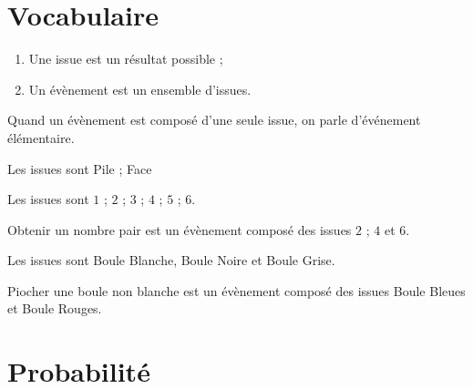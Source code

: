 \documentclass[a4paper,10pt]{report}
\begin{document}
\vspace{-3mm}
\section{Vocabulaire}

\vspace{-4mm}
\begin{defn}
\begin{enumerate}
\item[•] Une issue est un résultat possible ;
\item[•] Un évènement est un ensemble d'issues.
\end{enumerate} 
\end{defn}

\begin{rem}
\vspace{-4.5mm}\hspace{2.8cm} Quand un évènement est composé d'une seule issue, on parle d'événement
élémentaire.
\end{rem}

\setcounter{cex}{0}
\vspace{-1mm}
\begin{ex}

\vspace{-4.5mm}\hspace{2.8cm} Les issues sont Pile ; Face
\end{ex}

\vspace{-1mm}
\begin{ex}
\vspace{-4.5mm}\hspace{2.8cm} Les issues sont $1$ ; $2$ ; $3$ ; $4$ ; $5$ ; $6$.

\noindent \og Obtenir un nombre pair \fg{}  est un évènement composé des issues $2$ ; $4$ et $6$.
\end{ex}

\vspace{-1mm}
\begin{ex}
\vspace{-4.5mm}\hspace{2.8cm} Les issues sont Boule Blanche, Boule Noire et Boule Grise.

\noindent \og Piocher une boule non blanche \fg{} est un évènement composé des issues Boule Bleues et Boule Rouges.
\end{ex}

\vspace{-4mm}
\section{Probabilité}
\end{document}
